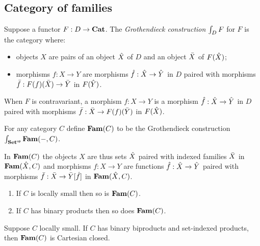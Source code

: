 \subsection{Category of families}

\begin{definition}
Suppose a functor $F: D \to \mathbf{Cat}$. The \emph{Grothendieck construction} $\int_{D}F$ for $F$ is the
category where:
\begin{itemize}
\item objects $X$ are pairs of an object $\hat{X}$ of $D$ and an object $\bar{X}$ of $F(\hat{X})$;
\item morphisms $f: X \to Y$ are morphisms $\hat{f}: \hat{X} \to \hat{Y}$ in $D$ paired with morphisms
$\bar{f}: F(f)(\bar{X}) \to \bar{Y}$ in $F(\hat{Y})$.
\end{itemize}
\end{definition}

\noindent When $F$ is contravariant, a morphism $f: X \to Y$ is a morphism $\hat{f}: \hat{X} \to \hat{Y}$ in
$D$ paired with morphisms $\bar{f}: \bar{X} \to F(f)(\bar{Y})$ in $F(\hat{X})$.

\begin{definition}
For any category $C$ define $\mathbf{Fam}(C)$ to be the Grothendieck construction
$\int_{\mathbf{Set}^{\mathsf{op}}}\mathbf{Fam}(-,C)$.
\end{definition}

\noindent In $\mathbf{Fam}(C)$ the objects $X$ are thus sets $\hat{X}$ paired with indexed families $\bar{X}$ in
$\mathbf{Fam}(\hat{X},C)$ and morphisms $f: X \to Y$ are functions $\hat{f}: \hat{X} \to \hat{Y}$ paired with
morphisms $\bar{f}: \bar{X} \to \bar{Y}[\hat{f}]$ in $\mathbf{Fam}(\hat{X},C)$.

\begin{proposition}
\item
\begin{enumerate}
\item If $C$ is locally small then so is $\mathbf{Fam}(C)$.
\item If $C$ has binary products then so does $\mathbf{Fam}(C)$.
\end{enumerate}
\end{proposition}

\begin{proposition}
Suppose $C$ locally small. If $C$ has binary biproducts and set-indexed products, then $\mathbf{Fam}(C)$ is Cartesian
closed. 
\end{proposition}

